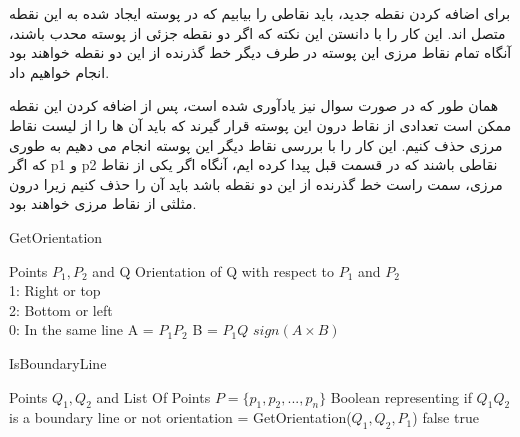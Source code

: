 \documentclass{article}
\begin{document}
برای اضافه کردن نقطه جدید، باید نقاطی را بیابیم که در پوسته ایجاد شده به این نقطه متصل اند.
    این کار را با دانستن این نکته که اگر دو نقطه جزئی از پوسته محدب باشند، آنگاه تمام نقاط مرزی این پوسته
    در طرف دیگر خط گذرنده از این دو نقطه خواهند بود انجام خواهیم داد.
    
    همان طور که در صورت سوال نیز یادآوری شده است، پس از اضافه کردن این نقطه ممکن است تعدادی از نقاط درون این پوسته قرار گیرند
    که باید آن ها را از لیست نقاط مرزی حذف کنیم.
    این کار را با بررسی نقاط دیگر این پوسته انجام می دهیم به طوری که اگر p1 و p2
    نقاطی باشند که در قسمت قبل پیدا کرده ایم، آنگاه اگر یکی از نقاط مرزی، سمت راست خط گذرنده از این دو نقطه باشد
    باید آن را حذف کنیم زیرا درون مثلثی از نقاط مرزی خواهند بود.

    \begin{latin}
        \begin{algorithm}[H]
            \caption{GetOrientation}
            \begin{algorithmic}
                \Require Points $P_1, P_2$ and Q
                \Ensure Orientation of Q with respect to $P_1$ and $P_2$
                \\ 1: Right or top
                \\ 2: Bottom or left
                \\ 0: In the same line
                \State A = $P_1P_2$
                \State B = $P_1Q$
                \State \Return $sign(A \times B)$
                
            \end{algorithmic}
        \end{algorithm}
    \end{latin}

    \begin{latin}
        \begin{algorithm}[H]
            \caption{IsBoundaryLine}
            \begin{algorithmic}
                \Require Points $Q_1, Q_2$ and List Of Points $P = \{p_1, p_2,..., p_n\}$
                \Ensure Boolean representing if $Q_1Q_2$ is a boundary line or not
                \State orientation = GetOrientation($Q_1, Q_2, P_1$)
                        \State \Return false
                    \EndIf
                \EndFor
                \State \Return true
            \end{algorithmic}
        \end{algorithm}
    \end{latin}
\end{document}
